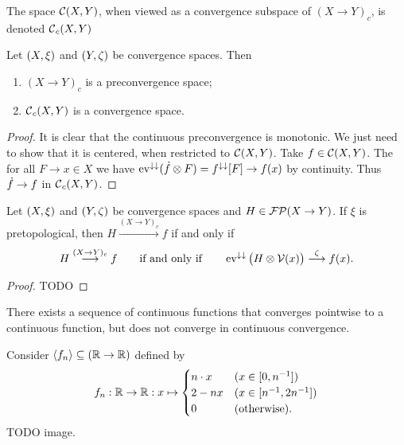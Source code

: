 The space $\operatorname{\mathcal{C}}(X,Y)$, when viewed as a convergence subspace of $(X\to Y)_c$, is denoted $\operatorname{\mathcal{C}}_c(X,Y)$

\begin{lemma}
Let $\left( X,\xi \right)$ and $\left( Y,\zeta \right)$ be convergence spaces. Then
\begin{enumerate}
\item $(X\to Y)_c$ is a preconvergence space;
\item $\operatorname{\mathcal{C}}_c(X,Y)$ is a convergence space.
\end{enumerate}
\end{lemma}
\begin{proof}
It is clear that the continuous preconvergence is monotonic. We just need to show that it is centered, when restricted to $\operatorname{\mathcal{C}}(X,Y)$. Take $f\in \operatorname{\mathcal{C}}(X,Y)$. The for all $F\to x\in X$ we have $\operatorname{ev}^{\downarrow\downarrow}(\dot{f}\otimes F) = f^{\downarrow\downarrow}[F] \to f(x)$ by continuity. Thus $\dot{f}\to f$ in $\operatorname{\mathcal{C}}_c(X,Y)$.
\end{proof}

\begin{lemma}
Let $\left( X,\xi \right)$ and $\left( Y,\zeta \right)$ be convergence spaces and $H\in \operatorname{\mathcal{FP}}(X\to Y)$. If $\xi$ is pretopological, then $H\overset{(X\to Y)_c}{\longrightarrow} f$ \textup{if and only if}
\[ H\overset{(X\to Y)_c}{\longrightarrow} f\qquad \text{if and only if} \qquad \operatorname{ev}^{\downarrow\downarrow}\big(H\otimes \operatorname{\mathcal{V}}(x)\big) \overset{\zeta}{\longrightarrow} f(x). \]
\end{lemma}
\begin{proof}
TODO
\end{proof}

\begin{example}
There exists a sequence of continuous functions that converges pointwise to a continuous function, but does not converge in continuous convergence.

Consider $\left\langle f_n \right\rangle \subseteq (\mathbb{R}\to\mathbb{R})$ defined by
\[ f_n: \R\to\R: x\mapsto \begin{cases}
n\cdot x & (x\in \interval{0,n^{-1}}) \\
2 - nx & (x\in \interval{n^{-1}, 2n^{-1}}) \\
0 & (\text{otherwise}).
\end{cases} \]
TODO image.
\end{example}

